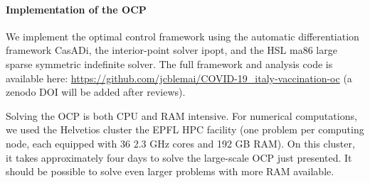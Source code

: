 \paragraph{Implementation of the OCP}
We implement the optimal control framework using the automatic differentiation framework CasADi\cite{Andersson:CasADiSymbolicPackage:2012}, the interior-point solver ipopt\cite{Wachter:ImplementationInteriorpointFilter:2006}, and the HSL ma86 large sparse symmetric indefinite solver\cite{HSLCollectionFortran}. The full framework and analysis code is available here: \url{https://github.com/jcblemai/COVID-19_italy-vaccination-oc} (a zenodo DOI will be added after reviews). 

Solving the OCP is both CPU and RAM intensive. For numerical computations, we used the Helvetios cluster the EPFL HPC facility (one problem per computing node, each equipped with 36 2.3 GHz cores and 192 GB RAM). On this cluster, it takes approximately four days to solve the large-scale OCP just presented. It should be possible to solve even larger problems with more RAM available. 

